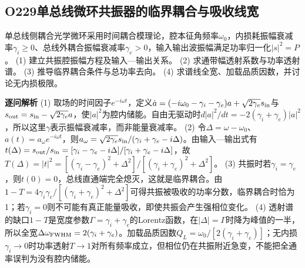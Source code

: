 \subsection*{O229\quad 单总线微环共振器的临界耦合与吸收线宽}
单总线侧耦合光学微环采用时间耦合模理论，腔本征角频率$\omega_0$，内损耗振幅衰减率$\gamma_i\ge0$、总线外耦合振幅衰减率$\gamma_e>0$，输入输出波振幅满足功率归一化$|s|^2=P$。
(1) 建立共振腔振幅方程及输入—输出关系。
(2) 求通带幅透射系数与功率透射谱。
(3) 推导临界耦合条件与总功率去向。
(4) 求谱线全宽、加载品质因数，并讨论无内损极限。
\par\textbf{逐问解析}
(1) 取场的时间因子$e^{-i\omega t}$，定义$\dot a=(-i\omega_0-\gamma_i-\gamma_e)a+\sqrt{2\gamma_e}s_{\rm in}$与$s_{\rm out}=s_{\rm in}-\sqrt{2\gamma_e}a$，使$|a|^2$为腔内储能。自由无驱动时$d|a|^2/dt=-2(\gamma_i+\gamma_e)|a|^2$，所以这里$\gamma$表示振幅衰减率，而非能量衰减率。
(2) 令$\Delta=\omega-\omega_0$、$a(t)=a_\omega e^{-i\omega t}$，则$a_\omega=\sqrt{2\gamma_e}s_{\rm in}/(\gamma_i+\gamma_e-i\Delta)$。由输入—输出式有$t(\Delta)=s_{\rm out}/s_{\rm in}=[\gamma_i-\gamma_e-i\Delta]/[\gamma_i+\gamma_e-i\Delta]$，故$T(\Delta)=|t|^2=[(\gamma_i-\gamma_e)^2+\Delta^2]/[(\gamma_i+\gamma_e)^2+\Delta^2]$。
(3) 共振时若$\gamma_i=\gamma_e$，则$t(0)=0$，总线直通端完全熄灭，这就是临界耦合。由$1-T=4\gamma_i\gamma_e/[(\gamma_i+\gamma_e)^2+\Delta^2]$可得共振被吸收的功率分数，临界耦合时恰为1；若$\gamma_i=0$则不可能有真正能量吸收，即使共振会产生强相位变化。
(4) 透射谱的缺口$1-T$是宽度参数$\Gamma=\gamma_i+\gamma_e$的Lorentz函数，在$|\Delta|=\Gamma$时降为峰值的一半，所以全宽$\Delta\omega_{\rm FWHM}=2(\gamma_i+\gamma_e)$。加载品质因数$Q_L=\omega_0/[2(\gamma_i+\gamma_e)]$；无内损$\gamma_i\to0$时功率透射$T\to1$对所有频率成立，但相位仍在共振附近急变，不能把全通率误判为没有腔内储能。
\par\medskip

